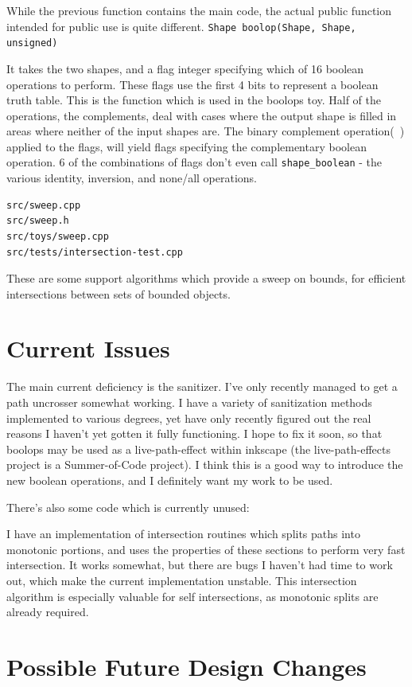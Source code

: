 \documentclass[openany]{book}
\begin{document}
While the previous function contains the main code, the actual public function intended for public use is quite different.
\verb|Shape boolop(Shape, Shape, unsigned)|

It takes the two shapes, and a flag integer specifying which of 16 boolean operations to perform. These flags use the first 4 bits to represent a boolean truth table. This is the function which is used in the boolops toy. Half of the operations, the complements, deal with cases where the output shape is filled in areas where neither of the input shapes are. The binary complement operation(~) applied to the flags, will yield flags specifying the complementary boolean operation. 6 of the combinations of flags don't even call \verb|shape_boolean| - the various identity, inversion, and none/all operations.

\begin{verbatim}
src/sweep.cpp
src/sweep.h
src/toys/sweep.cpp
src/tests/intersection-test.cpp
\end{verbatim}

These are some support algorithms which provide a sweep on bounds, for efficient intersections between sets of bounded objects.
\section{Current Issues}

The main current deficiency is the sanitizer. I've only recently managed to get a path uncrosser somewhat working. I have a variety of sanitization methods implemented to various degrees, yet have only recently figured out the real reasons I haven't yet gotten it fully functioning. I hope to fix it soon, so that boolops may be used as a live-path-effect within inkscape (the live-path-effects project is a Summer-of-Code project). I think this is a good way to introduce the new boolean operations, and I definitely want my work to be used.

There's also some code which is currently unused:

I have an implementation of intersection routines which splits paths into monotonic portions, and uses the properties of these sections to perform very fast intersection. It works somewhat, but there are bugs I haven't had time to work out, which make the current implementation unstable. This intersection algorithm is especially valuable for self intersections, as monotonic splits are already required.

\section{Possible Future Design Changes}
\end{document}
